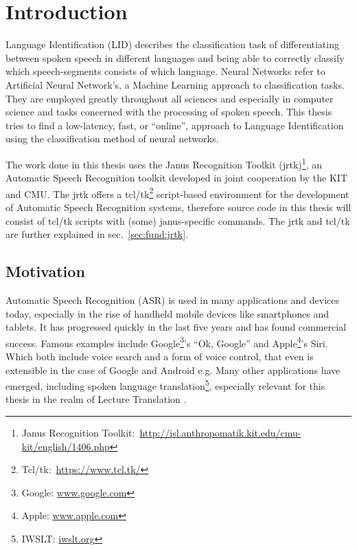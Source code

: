 
\chapter{Introduction}
\label{ch:Introduction}
Language Identification (LID) describes the classification task of differentiating between spoken speech in different languages and being able to correctly classify which speech-segments consists of which language.  Neural Networks refer to Artificial Neural Network's, a Machine Learning approach to classification tasks. They are employed greatly throughout all sciences and especially in computer science and tasks concerned with the processing of spoken speech. This thesis tries to find a low-latency, fast, or ``online'', approach to Language Identification using the classification method of neural networks.

The work done in this thesis uses the Janus Recognition Toolkit (jrtk)\footnote{Janus Recognition Toolkit:~\url{http://isl.anthropomatik.kit.edu/cmu-kit/english/1406.php}}, an Automatic Speech Recognition toolkit developed in joint cooperation by the KIT and CMU. The jrtk offers a tcl/tk\footnote{Tcl/tk:~\url{https://www.tcl.tk/}} script-based environment for the development of Automatic Speech Recognition systems, therefore source code in this thesis will consist of tcl/tk scripts with (some) janus-specific commands. The jrtk and tcl/tk are further explained in sec.~\ref{sec:fund:jrtk}.

\section{Motivation}
\label{sec:Introduction:Motivation}
Automatic Speech Recognition (ASR) is used in many applications and devices today, especially in the rise of handheld mobile devices like smartphones and tablets. It has progressed quickly in the last five years and has found commercial success. Famous examples include Google\footnote{Google: \url{www.google.com}}'s ``Ok, Google'' and Apple\footnote{Apple: \url{www.apple.com}}'s Siri. Which both include voice search\cite{franz2008voice} and a form of voice control, that even is extensible in the case of Google and Android e.g\cite{voicecontrol2014}. Many other applications have emerged, including spoken language translation\footnote{IWSLT: \url{iwslt.org}}, especially relevant for this thesis in the realm of Lecture Translation\cite{lecturetranslator2016} .

